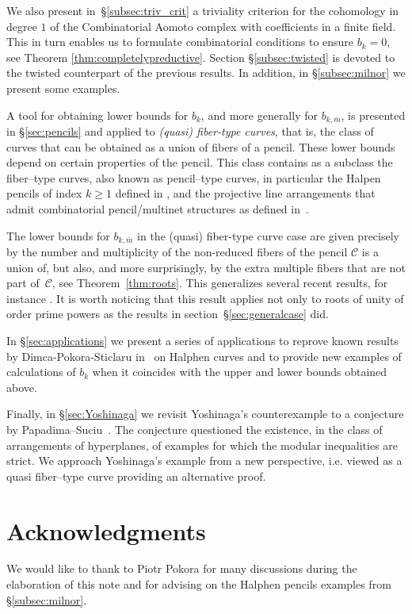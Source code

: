 \documentclass[11pt]{amsart}
\theoremstyle{plain}
\theoremstyle{definition}
\begin{document}
We also present in~\S\ref{subsec:triv_crit} a triviality criterion for the cohomology in degree $1$ of the Combinatorial Aomoto complex with coefficients in a finite field. This in turn enables us to formulate combinatorial conditions to ensure $b_k=0$, see Theorem \ref{thm:completelypreductive}.
Section \S\ref{subsec:twisted} is devoted to the twisted counterpart of the previous results. In addition, in 
\S\ref{subsec:milnor} we present some examples.

A tool for obtaining lower bounds for $b_k$, and more generally for $b_{k,\bar m}$, is presented in \S\ref{sec:pencils} and applied to \emph{(quasi) fiber-type curves}, that is, the class of curves that can be obtained as a union of fibers of a pencil. These lower bounds depend on certain properties of the pencil.
This class contains as a subclass the fiber--type curves, also known as pencil--type curves, in particular the Halpen pencils of index $k \geq 1$ defined in \cite{DLPU}, and the projective line arrangements that admit combinatorial pencil/multinet structures as defined in~\cite{CM,FY}. 

The lower bounds for $b_{k,\bar m}$ in the  (quasi) fiber-type curve case are given precisely by the number and multiplicity of the non-reduced fibers of the pencil $\mathcal{C}$ is a union of, but also, and more surprisingly, by the extra multiple fibers that are not part of~$\mathcal{C}$, see Theorem~\ref{thm:roots}. This generalizes several recent results, for instance \cite[Theorems 3.2 -- 3.4]{DPS}. 
It is worth noticing that this result applies not only to roots of unity of order prime powers as the results in section~\S\ref{sec:generalcase} did.

In \S\ref{sec:applications} we present a series of applications to reprove known results by Dimca-Pokora-Sticlaru in~\cite{DPS} on Halphen curves and to provide new examples of calculations of $b_k$ when it coincides with the upper and lower bounds obtained above.

Finally, in \S\ref{sec:Yoshinaga}
we revisit Yoshinaga's counterexample to a conjecture by Papadima--Suciu~\cite{PS3}. The conjecture questioned the existence, in the class of arrangements of hyperplanes, of examples for which the modular inequalities are strict. We approach Yoshinaga's example from a new perspective, i.e. viewed as a quasi fiber--type curve providing an alternative proof.

\section*{Acknowledgments}
We would like to thank to Piotr Pokora for many discussions during the elaboration of this note and for advising  on the Halphen pencils examples from  \S\ref{subsec:milnor}.
\end{document}
